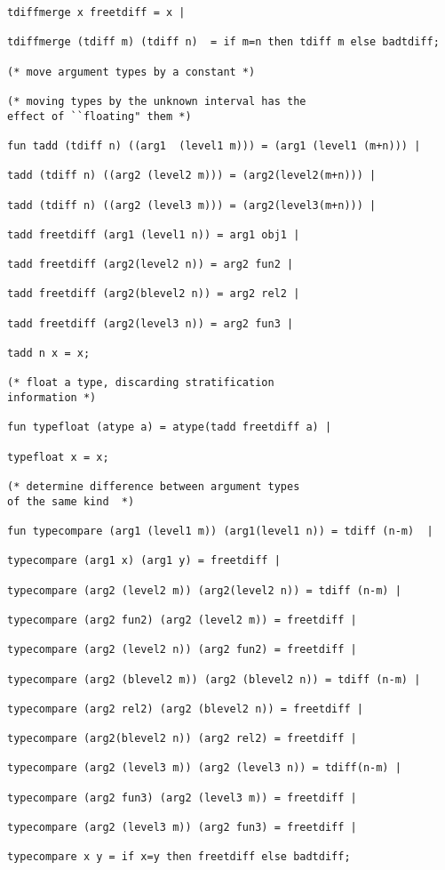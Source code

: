 \documentclass{article}
\begin{document}
{{\begin{verbatim}
tdiffmerge x freetdiff = x |

tdiffmerge (tdiff m) (tdiff n)  = if m=n then tdiff m else badtdiff;

(* move argument types by a constant *)

(* moving types by the unknown interval has the
effect of ``floating" them *)

fun tadd (tdiff n) ((arg1  (level1 m))) = (arg1 (level1 (m+n))) |

tadd (tdiff n) ((arg2 (level2 m))) = (arg2(level2(m+n))) |

tadd (tdiff n) ((arg2 (level3 m))) = (arg2(level3(m+n))) |

tadd freetdiff (arg1 (level1 n)) = arg1 obj1 |

tadd freetdiff (arg2(level2 n)) = arg2 fun2 |

tadd freetdiff (arg2(blevel2 n)) = arg2 rel2 |

tadd freetdiff (arg2(level3 n)) = arg2 fun3 |

tadd n x = x;

(* float a type, discarding stratification
information *)

fun typefloat (atype a) = atype(tadd freetdiff a) |

typefloat x = x;

(* determine difference between argument types
of the same kind  *)

fun typecompare (arg1 (level1 m)) (arg1(level1 n)) = tdiff (n-m)  |

typecompare (arg1 x) (arg1 y) = freetdiff |

typecompare (arg2 (level2 m)) (arg2(level2 n)) = tdiff (n-m) |

typecompare (arg2 fun2) (arg2 (level2 m)) = freetdiff |

typecompare (arg2 (level2 n)) (arg2 fun2) = freetdiff |

typecompare (arg2 (blevel2 m)) (arg2 (blevel2 n)) = tdiff (n-m) |

typecompare (arg2 rel2) (arg2 (blevel2 n)) = freetdiff |

typecompare (arg2(blevel2 n)) (arg2 rel2) = freetdiff |

typecompare (arg2 (level3 m)) (arg2 (level3 n)) = tdiff(n-m) |

typecompare (arg2 fun3) (arg2 (level3 m)) = freetdiff |

typecompare (arg2 (level3 m)) (arg2 fun3) = freetdiff |

typecompare x y = if x=y then freetdiff else badtdiff;


\end{verbatim}}}
\end{document}
